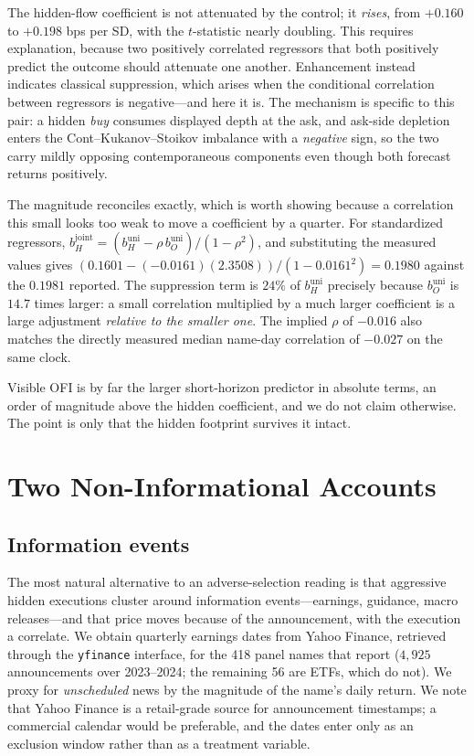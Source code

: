 \documentclass[11pt]{article}
\begin{document}
The hidden-flow coefficient is not attenuated by the control; it \emph{rises}, from $+0.160$
to $+0.198$ bps per SD, with the $t$-statistic nearly doubling. This requires explanation,
because two positively correlated regressors that both positively predict the outcome should
attenuate one another. Enhancement instead indicates classical suppression, which arises
when the conditional correlation between regressors is negative---and here it is. The
mechanism is specific to this pair: a hidden \emph{buy} consumes displayed depth at the ask,
and ask-side depletion enters the Cont--Kukanov--Stoikov imbalance with a \emph{negative}
sign, so the two carry mildly opposing contemporaneous components even though both forecast
returns positively.

The magnitude reconciles exactly, which is worth showing because a correlation this small
looks too weak to move a coefficient by a quarter. For standardized regressors,
$b_H^{\text{joint}} = (b_H^{\text{uni}} - \rho\, b_O^{\text{uni}})/(1-\rho^2)$, and
substituting the measured values gives
$(0.1601 - (-0.0161)(2.3508))/(1-0.0161^2) = 0.1980$ against the $0.1981$ reported. The
suppression term is $24\%$ of $b_H^{\text{uni}}$ precisely because $b_O^{\text{uni}}$ is
$14.7$ times larger: a small correlation multiplied by a much larger coefficient is a large
adjustment \emph{relative to the smaller one}. The implied $\rho$ of $-0.016$ also matches
the directly measured median name-day correlation of $-0.027$ on the same clock.

Visible OFI is by far the larger short-horizon predictor in absolute terms, an order of
magnitude above the hidden coefficient, and we do not claim otherwise. The point is only
that the hidden footprint survives it intact.

\section{Two Non-Informational Accounts}
\label{sec:alternatives}

\subsection{Information events}

The most natural alternative to an adverse-selection reading is that aggressive hidden
executions cluster around information events---earnings, guidance, macro releases---and that
price moves because of the announcement, with the execution a correlate. We obtain quarterly
earnings dates from Yahoo Finance, retrieved through the \texttt{yfinance} interface, for the
418 panel names that report ($4{,}925$ announcements over 2023--2024; the remaining 56 are
ETFs, which do not). We proxy for \emph{unscheduled} news by the magnitude of the name's
daily return. We note that Yahoo Finance is a retail-grade source for announcement
timestamps; a commercial calendar would be preferable, and the dates enter only as an
exclusion window rather than as a treatment variable.
\end{document}
